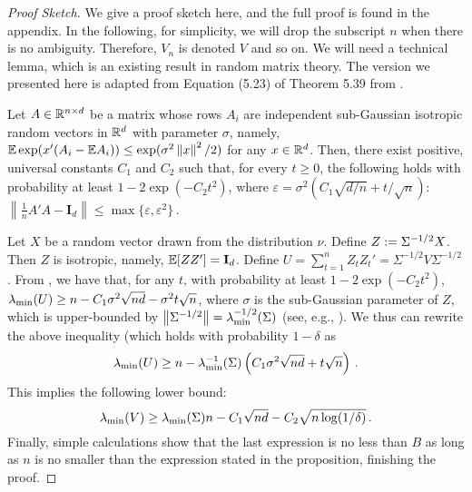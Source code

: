 \begin{proof}[Proof Sketch]
We give a proof sketch here, and the full proof is found in the appendix.
In the following, for simplicity, we will drop the subscript $n$ when there is no ambiguity.  Therefore, $V_n$ is denoted $V$ and so on.
%
We will need a technical lemma, which is an existing result in random matrix theory. The version we presented here is adapted from Equation (5.23) of Theorem 5.39 from \citet{vershynin2010introduction}.
\begin{lemma}
\label{lem:rmsv}
Let $A\in\mathbb{R}^{n\times d}$ be a matrix whose rows $A_i$ are independent sub-Gaussian isotropic random vectors in $\mathbb{R}^d$ with parameter $\sigma$, namely, $\mathbb{E} \exp(x' (A_i - \mathbb{E} A_i)) \le \exp(\sigma^2 \left\|x\right\|^2/2)$ for any $x \in \mathbb{R}^d$.  Then, there exist positive, universal constants $C_1$ and $C_2$ such that, for every $t \ge 0$, the following holds with
probability at least $1-2\exp(-C_2t^2)$, where $\varepsilon = \sigma^2 (C_1 \sqrt{d/n} + t/\sqrt{n})$: $\left\|\frac{1}{n} A'A - \mathbf{I}_d \right\| \le \max\{\varepsilon, \varepsilon^2\}\,.$
\end{lemma}

Let $X$ be a random vector drawn from the distribution $\nu$.  Define $Z:= \Sigma^{-1/2}X$.  Then $Z$ is isotropic, namely, $\mathbb{E}[ZZ'] = \mathbf{I}_d$.  Define $U=\sum_{t=1}^n Z_tZ_t' = \Sigma^{-1/2}V\Sigma^{-1/2}$.
From , we have that, for any $t$, with probability at least $1-2\exp(-C_2t^2)$, $\lambda_{\min}(U)\ge n - C_1 \sigma^2 \sqrt{nd} - \sigma^2 t \sqrt{n}$,
where $\sigma$ is the sub-Gaussian parameter of $Z$, which is upper-bounded by $\left\|\Sigma^{-1/2}\right\| = \lambda_{\min}^{-1/2}(\Sigma)$ (see, e.g., \citet{vershynin2010introduction}).  
We thus can rewrite the above inequality (which holds with probability $1-\delta$ as
\[
\lambda_{\min}(U) \ge n - \lambda_{\min}^{-1}(\Sigma) \left(C_1 \sigma^2 \sqrt{nd} + t \sqrt{n} \right) \,.
\]
This implies the following lower bound:
\[
\lambda_{\min}(V) \ge \lambda_{\min}(\Sigma) n - C_1 \sqrt{nd} - C_2 \sqrt{n \log(1/\delta)}\,.
\]
Finally, simple calculations show that the last expression is no less than $B$ as long as $n$ is no smaller than the expression stated in the proposition, finishing the proof.
\end{proof}

